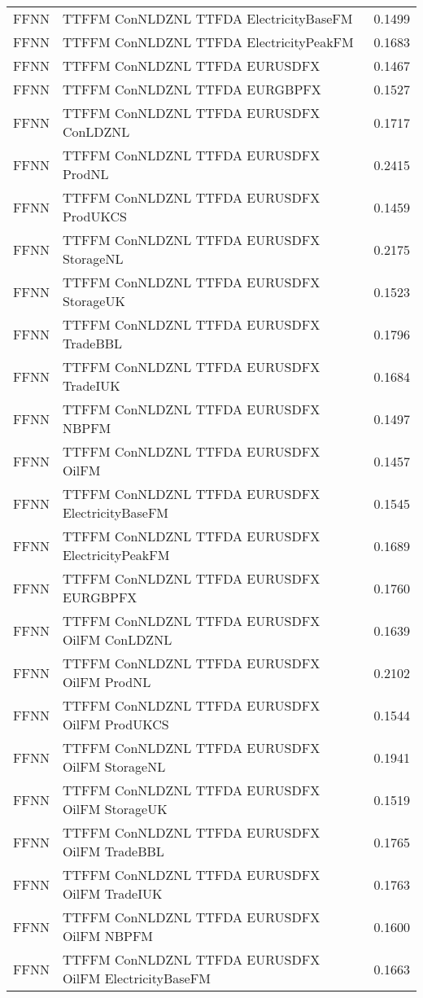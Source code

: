 \begin{table}[h!]
\begin{adjustbox}{max width=\textwidth}
\begin{tabular}{llr}
  FFNN & TTFFM ConNLDZNL TTFDA ElectricityBaseFM & 0.1499 \\ 
  FFNN & TTFFM ConNLDZNL TTFDA ElectricityPeakFM & 0.1683 \\ 
  FFNN & TTFFM ConNLDZNL TTFDA EURUSDFX & 0.1467 \\ 
  FFNN & TTFFM ConNLDZNL TTFDA EURGBPFX & 0.1527 \\ 
  FFNN & TTFFM ConNLDZNL TTFDA EURUSDFX ConLDZNL & 0.1717 \\ 
  FFNN & TTFFM ConNLDZNL TTFDA EURUSDFX ProdNL & 0.2415 \\ 
  FFNN & TTFFM ConNLDZNL TTFDA EURUSDFX ProdUKCS & 0.1459 \\ 
  FFNN & TTFFM ConNLDZNL TTFDA EURUSDFX StorageNL & 0.2175 \\ 
  FFNN & TTFFM ConNLDZNL TTFDA EURUSDFX StorageUK & 0.1523 \\ 
  FFNN & TTFFM ConNLDZNL TTFDA EURUSDFX TradeBBL & 0.1796 \\ 
  FFNN & TTFFM ConNLDZNL TTFDA EURUSDFX TradeIUK & 0.1684 \\ 
  FFNN & TTFFM ConNLDZNL TTFDA EURUSDFX NBPFM & 0.1497 \\ 
  FFNN & TTFFM ConNLDZNL TTFDA EURUSDFX OilFM & 0.1457 \\ 
  FFNN & TTFFM ConNLDZNL TTFDA EURUSDFX ElectricityBaseFM & 0.1545 \\ 
  FFNN & TTFFM ConNLDZNL TTFDA EURUSDFX ElectricityPeakFM & 0.1689 \\ 
  FFNN & TTFFM ConNLDZNL TTFDA EURUSDFX EURGBPFX & 0.1760 \\ 
  FFNN & TTFFM ConNLDZNL TTFDA EURUSDFX OilFM ConLDZNL & 0.1639 \\ 
  FFNN & TTFFM ConNLDZNL TTFDA EURUSDFX OilFM ProdNL & 0.2102 \\ 
  FFNN & TTFFM ConNLDZNL TTFDA EURUSDFX OilFM ProdUKCS & 0.1544 \\ 
  FFNN & TTFFM ConNLDZNL TTFDA EURUSDFX OilFM StorageNL & 0.1941 \\ 
  FFNN & TTFFM ConNLDZNL TTFDA EURUSDFX OilFM StorageUK & 0.1519 \\ 
  FFNN & TTFFM ConNLDZNL TTFDA EURUSDFX OilFM TradeBBL & 0.1765 \\ 
  FFNN & TTFFM ConNLDZNL TTFDA EURUSDFX OilFM TradeIUK & 0.1763 \\ 
  FFNN & TTFFM ConNLDZNL TTFDA EURUSDFX OilFM NBPFM & 0.1600 \\ 
  FFNN & TTFFM ConNLDZNL TTFDA EURUSDFX OilFM ElectricityBaseFM & 0.1663 \\ 

\end{tabular}
\end{adjustbox}
\end{table}

